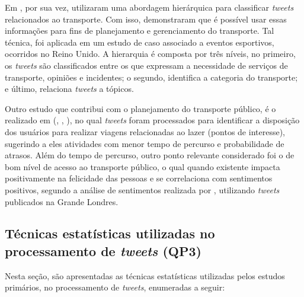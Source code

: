 \documentclass[
	12pt,				%
	oneside,			%
	a4paper,			%
	english,			%
	brazil				%
	]{abntex2ppgsi}
\begin{document}
{{Em \cite{Gal-Tzur2014}, por sua vez, utilizaram uma abordagem hierárquica para classificar \textit{tweets} relacionados ao transporte. Com isso, demonstraram que é possível usar essas informações para fins de planejamento e gerenciamento do transporte. Tal técnica, foi aplicada em um estudo de caso associado a eventos esportivos, ocorridos no Reino Unido. A hierarquia é composta por três níveis, no primeiro, os \textit{tweets} são classificados entre os que expressam a necessidade de serviços de transporte, opiniões e incidentes; o segundo, identifica a categoria do transporte; e último, relaciona \textit{tweets} a tópicos. 

Outro estudo que contribui com o planejamento do transporte público, é o realizado em (\citeauthor{Gkiotsalitis2015}, \citeyear{Gkiotsalitis2015}, \citeyear{Gkiotsalitis2016}), no qual \textit{tweets} foram processados para identificar a disposição dos usuários para realizar viagens relacionadas ao lazer (pontos de interesse), sugerindo a eles atividades com menor tempo de percurso e probabilidade de atrasos. Além do tempo de percurso, outro ponto relevante considerado foi o de bom nível de acesso ao transporte público, o qual quando existente impacta positivamente na felicidade das pessoas e se correlaciona com sentimentos positivos, segundo a análise de sentimentos realizada por \cite{Guo2016}, utilizando \textit{tweets} publicados na Grande Londres.

\subsection{Técnicas estatísticas utilizadas no processamento de \textit{tweets} (QP3)}
Nesta seção, são apresentadas as técnicas estatísticas utilizadas pelos estudos primários, no processamento de \textit{tweets}, enumeradas a seguir:

}}
\end{document}
